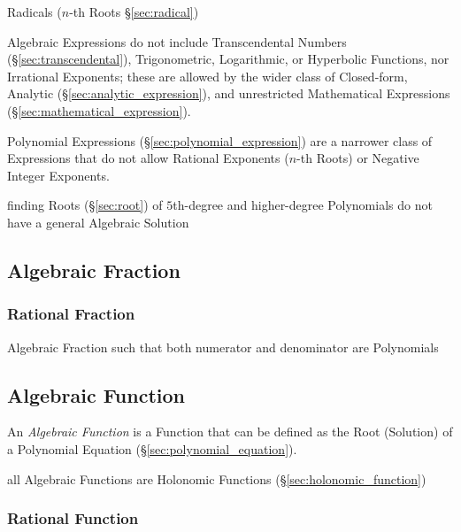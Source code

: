 Radicals ($n$-th Roots \S\ref{sec:radical})

Algebraic Expressions do not include Transcendental Numbers
(\S\ref{sec:transcendental}), Trigonometric, Logarithmic, or Hyperbolic
Functions, nor Irrational Exponents; these are allowed by the wider class of
Closed-form, Analytic (\S\ref{sec:analytic_expression}), and unrestricted
Mathematical Expressions (\S\ref{sec:mathematical_expression}).

\fist Polynomial Expressions (\S\ref{sec:polynomial_expression}) are a narrower
class of Expressions that do not allow Rational Exponents ($n$-th Roots) or
Negative Integer Exponents.

finding Roots (\S\ref{sec:root}) of $5$th-degree and higher-degree
Polynomials do not have a general Algebraic Solution



\subsection{Algebraic Fraction}\label{sec:algebraic_fraction}

\subsubsection{Rational Fraction}\label{sec:rational_fraction}

Algebraic Fraction such that both numerator and denominator are Polynomials



\subsection{Algebraic Function}\label{sec:algebraic_function}

An \emph{Algebraic Function} is a Function that can be defined as the Root
(Solution) of a Polynomial Equation (\S\ref{sec:polynomial_equation}).

all Algebraic Functions are Holonomic Functions (\S\ref{sec:holonomic_function})



\subsubsection{Rational Function}\label{sec:rational_function}


